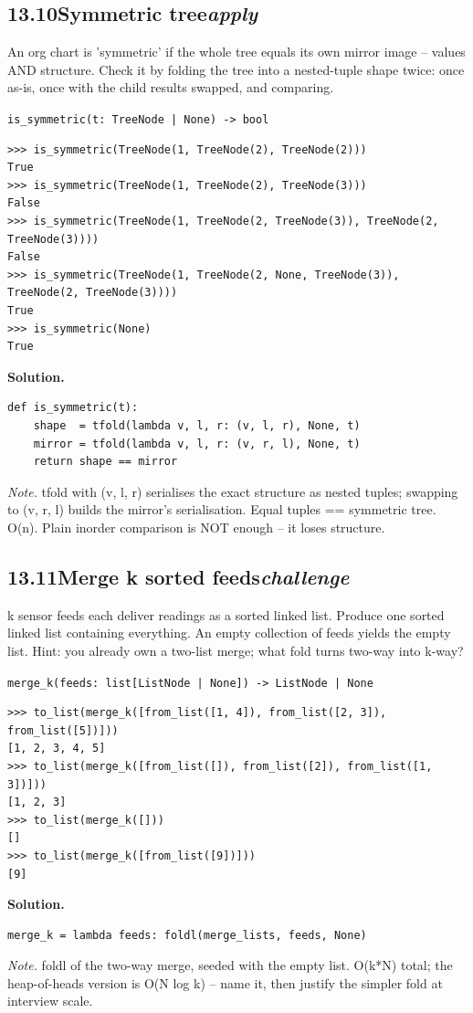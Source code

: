\documentclass[10pt,letterpaper]{book}
\begin{document}
\subsection*{13.10\quad Symmetric tree\hfill\textnormal{\textit{apply}}}
An org chart is 'symmetric' if the whole tree equals its own mirror image -- values AND structure. Check it by folding the tree into a nested-tuple shape twice: once as-is, once with the child results swapped, and comparing.

\noindent\texttt{is\_symmetric(t: TreeNode | None) -> bool}
\begin{lstlisting}[style=ex]
>>> is_symmetric(TreeNode(1, TreeNode(2), TreeNode(2)))
True
>>> is_symmetric(TreeNode(1, TreeNode(2), TreeNode(3)))
False
>>> is_symmetric(TreeNode(1, TreeNode(2, TreeNode(3)), TreeNode(2, TreeNode(3))))
False
>>> is_symmetric(TreeNode(1, TreeNode(2, None, TreeNode(3)), TreeNode(2, TreeNode(3))))
True
>>> is_symmetric(None)
True
\end{lstlisting}
\noindent\textbf{Solution.}
\begin{lstlisting}[style=code]
def is_symmetric(t):
    shape  = tfold(lambda v, l, r: (v, l, r), None, t)
    mirror = tfold(lambda v, l, r: (v, r, l), None, t)
    return shape == mirror
\end{lstlisting}
\noindent\textit{Note.} tfold with (v, l, r) serialises the exact structure as nested tuples; swapping to (v, r, l) builds the mirror's serialisation. Equal tuples == symmetric tree. O(n). Plain inorder comparison is NOT enough -- it loses structure.

\subsection*{13.11\quad Merge k sorted feeds\hfill\textnormal{\textit{challenge}}}
k sensor feeds each deliver readings as a sorted linked list. Produce one sorted linked list containing everything. An empty collection of feeds yields the empty list. Hint: you already own a two-list merge; what fold turns two-way into k-way?

\noindent\texttt{merge\_k(feeds: list[ListNode | None]) -> ListNode | None}
\begin{lstlisting}[style=ex]
>>> to_list(merge_k([from_list([1, 4]), from_list([2, 3]), from_list([5])]))
[1, 2, 3, 4, 5]
>>> to_list(merge_k([from_list([]), from_list([2]), from_list([1, 3])]))
[1, 2, 3]
>>> to_list(merge_k([]))
[]
>>> to_list(merge_k([from_list([9])]))
[9]
\end{lstlisting}
\noindent\textbf{Solution.}
\begin{lstlisting}[style=code]
merge_k = lambda feeds: foldl(merge_lists, feeds, None)
\end{lstlisting}
\noindent\textit{Note.} foldl of the two-way merge, seeded with the empty list. O(k*N) total; the heap-of-heads version is O(N log k) -- name it, then justify the simpler fold at interview scale.
\end{document}
